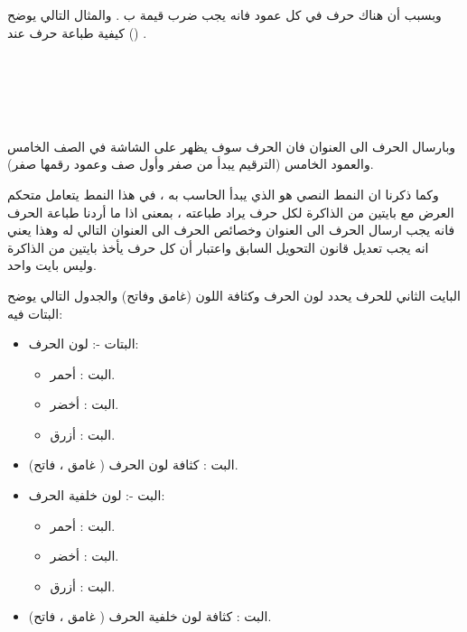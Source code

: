 \documentclass[document.tex]{subfiles}
\begin{document}
\begin{english}
\\
\\
\end{english}

وبسبب أن هناك  حرف في كل عمود فانه يجب ضرب قيمة  ب  . والمثال التالي يوضح كيفية طباعة حرف عند () .

\begin{english}
\\

\\

\\

\\
\end{english}

وبارسال الحرف الى العنوان  فان الحرف سوف يظهر على الشاشة في الصف الخامس والعمود الخامس (الترقيم يبدأ من صفر وأول صف وعمود رقمها صفر).
 

وكما ذكرنا ان النمط النصي  هو الذي يبدأ الحاسب به ، في هذا النمط يتعامل متحكم العرض مع بايتين من الذاكرة لكل حرف يراد طباعته ، بمعنى اذا ما أردنا طباعة الحرف  فانه يجب ارسال الحرف الى العنوان  وخصائص الحرف الى العنوان التالي له  وهذا يعني انه يجب تعديل قانون التحويل السابق واعتبار أن كل حرف يأخذ بايتين من الذاكرة وليس بايت واحد.

البايت الثاني للحرف يحدد لون الحرف وكثافة اللون (غامق وفاتح) والجدول التالي يوضح البتات فيه:

\begin{itemize}
\item البتات -: لون الحرف:
\begin{itemize}
\item البت : أحمر.
\item البت : أخضر.
\item البت : أزرق.

\end{itemize}

\item البت : كثافة لون الحرف (  غامق ،  فاتح).
\item البت -: لون خلفية الحرف:
\begin{itemize}
\item البت : أحمر.
\item البت : أخضر.
\item البت : أزرق.

\end{itemize}
\item البت : كثافة لون خلفية الحرف (  غامق ،  فاتح).


\end{itemize}
\end{document}
